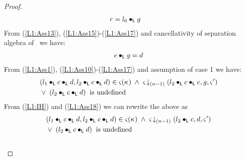 \begin{lemma}
\begin{proof}
\begin{align}
	& r = l_6 \bullet_{\textsf{L}} g \label{L1:Ass17}
\end{align}
%
From (\ref{L1:Ass13}), (\ref{L1:Ass15})-(\ref{L1:Ass17}) and cancellativity of separation algebra of \LState\ we have:
%
\begin{align}
	e \bullet_{\textsf{L}} g = d \label{L1:Ass18}
\end{align}
%
%
From (\ref{L1:Ass1}), (\ref{L1:Ass10})-(\ref{L1:Ass17}) and assumption of case 1 we have:
%
\begin{align}
	&(l_1 \bullet_{\textsf{L}} c \bullet_{\textsf{L}}  d, l_2 \bullet_{\textsf{L}} c \bullet_{\textsf{L}} d) \in \varsigma_{}(\kappa_{}) \;\land\;\varsigma_{} \!\downarrow_{(n-1)} \left(l_2 \bullet_{\textsf{L}} c \bullet_{\textsf{L}} e, g, \varsigma_{}'\right)  \nonumber\\
	&\lor\; (l_2 \bullet_{\textsf{L}} c \bullet_{\textsf{L}} d) \hspace*{0.2cm}\text{is undefined} \nonumber
\end{align}
From (\ref{L1:IH}) and (\ref{L1:Ass18}) we can rewrite the above as 
%
\begin{align}
	&(l_1 \bullet_{\textsf{L}} c \bullet_{\textsf{L}}  d, l_2 \bullet_{\textsf{L}} c \bullet_{\textsf{L}} d) \in \varsigma_{}(\kappa_{}) \;\land\;\varsigma_{} \!\downarrow_{(n-1)} \left(l_2 \bullet_{\textsf{L}} c, d, \varsigma_{}'\right)  \nonumber\\
	&\lor\; (l_2 \bullet_{\textsf{L}} c \bullet_{\textsf{L}} d) \hspace*{0.2cm}\text{is undefined} \nonumber
\end{align}\\
%
%
%
%


\end{proof}
\end{lemma}
